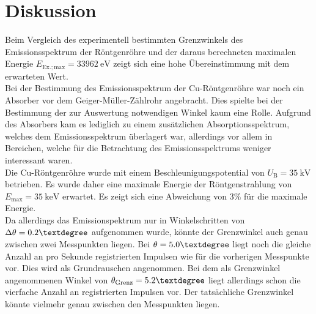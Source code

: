 \section{Diskussion}
\label{sec:Diskussion}

Beim Vergleich des experimentell bestimmten Grenzwinkels des Emissionsspektrum der Röntgenröhre und der daraus berechneten maximalen Energie $E_\mathrm{Ex.;max}=\SI{33962}{\electronvolt}$ zeigt sich eine hohe Übereinstimmung mit dem erwarteten Wert.\\
Bei der Bestimmung des Emissionsspektrum der Cu-Röntgenröhre war noch ein Absorber vor dem Geiger-Müller-Zählrohr angebracht. Dies spielte bei der Bestimmung der zur Auswertung notwendigen Winkel kaum eine Rolle. Aufgrund des Absorbers kam es lediglich zu einem zusätzlichen Absorptionsspektrum, welches dem Emissionsspektrum überlagert war, allerdings vor allem in Bereichen, welche für die Betrachtung des Emissionsspektrums weniger interessant waren.\\
Die Cu-Röntgenröhre wurde mit einem Beschleunigungspotential von $U_\mathrm{B}=\SI{35}{\kilo\volt}$ betrieben. Es wurde daher eine maximale Energie der Röntgenstrahlung von $E_\mathrm{max}=\SI{35}{\kilo\electronvolt}$ erwartet.
Es zeigt sich eine Abweichung von $3\%$ für die maximale Energie.\\
Da allerdings das Emissionspektrum nur in Winkelschritten von $\Delta \theta=0.2\textdegree$ aufgenommen wurde, könnte der Grenzwinkel auch genau zwischen zwei Messpunkten liegen. Bei $\theta=5.0\textdegree$ liegt noch die gleiche Anzahl an pro Sekunde registrierten Impulsen wie für die vorherigen Messpunkte vor. Dies wird als Grundrauschen angenommen.
Bei dem als Grenzwinkel angenommenen Winkel von $\theta_\mathrm{Grenz}=5.2\textdegree$ liegt allerdings schon die vierfache Anzahl an registrierten Impulsen vor. Der tatsächliche Grenzwinkel könnte vielmehr genau zwischen den Messpunkten liegen.

